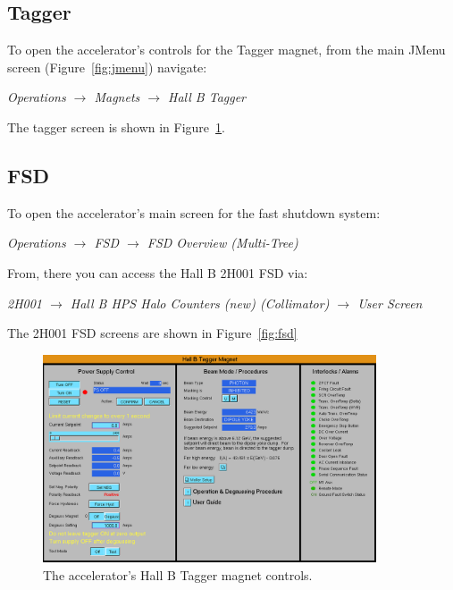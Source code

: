 \documentclass[amsmath,amssymb,notitlepage,11pt]{revtex4}
\begin{document}
    \subsection{Tagger}
To open the accelerator's controls for the Tagger magnet, from the main JMenu screen (Figure~\ref{fig:jmenu}) navigate:
\begin{center}{\em Operations $\to$ Magnets $\to$ Hall B Tagger}\end{center}
The tagger screen is shown in Figure~\ref{fig:tagger}.
    \subsection{FSD}
To open the accelerator's main screen for the fast shutdown system:
\begin{center}{\em Operations $\to$ FSD $\to$ FSD Overview (Multi-Tree)}\end{center}
From, there you can access the Hall B 2H001 FSD via:  
\begin{center}{\em 2H001 $\to$ Hall B HPS Halo Counters (new) (Collimator) $\to$ User Screen}\end{center}
The 2H001 FSD screens are shown in Figure~\ref{fig:fsd}
\begin{figure}[htbp]\centering
  \includegraphics[width=0.88\textwidth]{pics/tagger}
  \caption{The accelerator's Hall B Tagger magnet controls.\label{fig:tagger}}
\end{figure}
\end{document}
